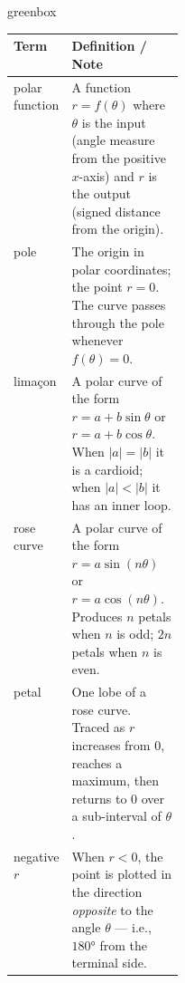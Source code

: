 \documentclass[10pt]{article}
\begin{document}
\vspace{0.08in}

\begin{skillbox}{greenbox}
\begin{tabularx}{\linewidth}{@{} p{0.22\linewidth} X @{}}
\textbf{Term} & \textbf{Definition / Note} \\
\midrule
polar function &
  A function $r = f(\theta)$ where $\theta$ is the input (angle measure from
  the positive $x$-axis) and $r$ is the output (signed distance from the origin). \\[4pt]
pole &
  The origin in polar coordinates; the point $r = 0$. The curve passes through
  the pole whenever $f(\theta) = 0$. \\[4pt]
limaçon &
  A polar curve of the form $r = a + b\sin\theta$ or $r = a + b\cos\theta$.
  When $|a| = |b|$ it is a cardioid; when $|a| < |b|$ it has an inner loop. \\[4pt]
rose curve &
  A polar curve of the form $r = a\sin(n\theta)$ or $r = a\cos(n\theta)$.
  Produces $n$ petals when $n$ is odd; $2n$ petals when $n$ is even. \\[4pt]
petal &
  One lobe of a rose curve. Traced as $r$ increases from $0$, reaches a maximum,
  then returns to $0$ over a sub-interval of $\theta$. \\[4pt]
negative $r$ &
  When $r < 0$, the point is plotted in the direction \emph{opposite} to the
  angle $\theta$ --- i.e., $180°$ from the terminal side. \\
\end{tabularx}
\end{skillbox}

\vspace{0.08in}
\end{document}
